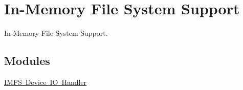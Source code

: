 \hypertarget{group__IMFS}{}\section{In-\/\+Memory File System Support}
\label{group__IMFS}


In-\/\+Memory File System Support.  


\subsection*{Modules}
\begin{DoxyCompactItemize}
\item 
\mbox{\hyperlink{group__IMFSDevices}{I\+M\+F\+S Device I\+O Handler}}
\end{DoxyCompactItemize}
